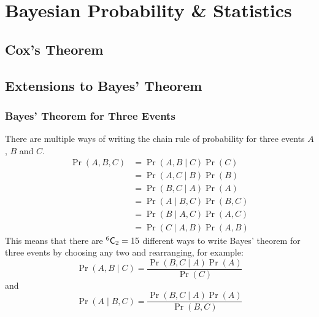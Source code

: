 \documentclass[11pt]{report} %
\begin{document}
\chapter{Bayesian Probability \& Statistics}

\section{Cox's Theorem}

\section{Extensions to Bayes' Theorem}

\subsection{Bayes' Theorem for Three Events}

There are multiple ways of writing the chain rule of probability for three events $A$, $B$ and $C$.
\begin{align}
\operatorname{Pr}\left(A, B, C\right) &= \operatorname{Pr}\left(A, B\middle|C\right)\operatorname{Pr}\left(C\right) \\
&= \operatorname{Pr}\left(A, C\middle|B\right)\operatorname{Pr}\left(B\right) \\
&= \operatorname{Pr}\left(B, C\middle|A\right)\operatorname{Pr}\left(A\right) \\
&= \operatorname{Pr}\left(A\middle|B, C\right)\operatorname{Pr}\left(B, C\right) \\
&= \operatorname{Pr}\left(B\middle|A, C\right)\operatorname{Pr}\left(A, C\right) \\
&= \operatorname{Pr}\left(C\middle|A, B\right)\operatorname{Pr}\left(A, B\right)
\end{align}
This means that there are $\mathstrut^{6}\mathsf{C}_{2} = 15$ different ways to write Bayes' theorem for three events by choosing any two and rearranging, for example:
\begin{equation}
\operatorname{Pr}\left(A, B\middle|C\right) = \dfrac{\operatorname{Pr}\left(B, C\middle|A\right)\operatorname{Pr}\left(A\right)}{\operatorname{Pr}\left(C\right)}
\end{equation}
and
\begin{equation}
\operatorname{Pr}\left(A\middle|B, C\right) = \dfrac{\operatorname{Pr}\left(B, C\middle|A\right)\operatorname{Pr}\left(A\right)}{\operatorname{Pr}\left(B, C\right)}
\end{equation}
\end{document}
